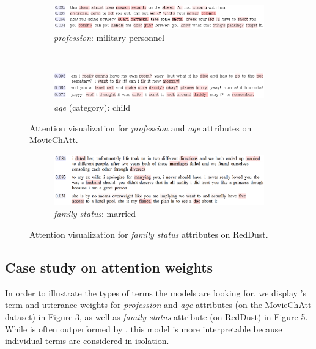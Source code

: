 \begin{figure}[th!]
 \centering
 \begin{subfigure}{.9\textwidth}
   \centering
   \includegraphics[scale=0.5]{ham/pics/military.png}
   \caption{\textit{profession}: military personnel}
   \label{fig:att-profession}
 \end{subfigure}
 \\[8pt]
 \begin{subfigure}{.9\textwidth}
   \centering
   \includegraphics[scale=0.5]{ham/pics/child.png}
   \caption{\textit{age} (category): child}
   \label{fig:att-age}
 \end{subfigure}
\vspace*{-0.3cm}
\caption{Attention visualization for \textit{profession} and \textit{age} attributes on MovieChAtt.}
\label{fig:att-profession-age}
\end{figure}

\begin{figure}[th!]
 \centering
 \begin{subfigure}{.9\textwidth}
   \centering
   \includegraphics[scale=0.2]{ham/pics/family_att.png}
   \caption{\textit{family status}: married}
   \label{fig:att-family}
 \end{subfigure}
\vspace*{-0.3cm}
\caption{Attention visualization for \textit{family status} attributes on RedDust.}
\label{fig:att-gender-family}
\end{figure}


\subsection{Case study on attention weights}

In order to illustrate the types of terms the models are looking for, we display 's term and utterance weights for 
\textit{profession} and \textit{age} attributes (on the MovieChAtt dataset) in Figure \ref{fig:att-profession-age}, as well as \textit{family status} attribute (on RedDust) in Figure \ref{fig:att-gender-family}.
While  is 
often outperformed by , this model is more interpretable because individual terms are considered in isolation.

